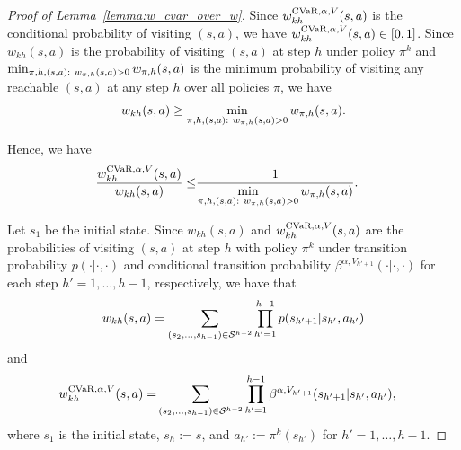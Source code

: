 \begin{proof}[Proof of Lemma~\ref{lemma:w_cvar_over_w}]
	Since $w^{\textup{CVaR},\alpha,V}_{kh}(s,a)$ is the conditional probability of visiting $(s,a)$, we have 
	$w^{\textup{CVaR},\alpha,V}_{kh}(s,a) \in [0,1]$.
	Since $w_{kh}(s,a)$ is the probability of visiting $(s,a)$ at step $h$ under policy $\pi^k$ and $\min_{\begin{subarray}{c}\pi,h,(s,a):\  w_{\pi,h}(s,a)>0\end{subarray}} w_{\pi,h}(s,a)$ is the minimum probability of visiting any reachable $(s,a)$ at any step $h$ over all policies $\pi$, we have
	\begin{align*}
		w_{kh}(s,a) \geq \min \limits_{\begin{subarray}{c}\pi,h,(s,a):\  w_{\pi,h}(s,a)>0\end{subarray}} w_{\pi,h}(s,a) . 
	\end{align*} 
	
	Hence, we have
	\begin{align}
		\frac{w^{\textup{CVaR},\alpha,V}_{kh}(s,a)}{w_{kh}(s,a)} \leq & \frac{1}{\min \limits_{\begin{subarray}{c}\pi,h,(s,a):\  w_{\pi,h}(s,a)>0\end{subarray}} w_{\pi,h}(s,a)} . \label{eq:1_over_w_min}
	\end{align}
	
	Let $s_1$ be the initial state. Since $w_{kh}(s,a)$ and $w^{\textup{CVaR},\alpha,V}_{kh}(s,a)$ are the probabilities of visiting $(s,a)$ at step $h$ with policy $\pi^k$ under transition probability $p(\cdot|\cdot,\cdot)$ and conditional transition probability $\beta^{\alpha,V_{h'+1}}(\cdot|\cdot,\cdot)$ for each step $h'=1,\dots,h-1$, respectively, we have that
	\begin{align*}
		w_{kh}(s,a) = \sum_{(s_2,\dots,s_{h-1}) \in \mathcal{S}^{h-2}} \prod_{h'=1}^{h-1} p(s_{h'+1}|s_{h'},a_{h'}) 
	\end{align*}
	and
	\begin{align*}
		w^{\textup{CVaR},\alpha,V}_{kh}(s,a) = & \sum_{(s_2,\dots,s_{h-1}) \in \mathcal{S}^{h-2}} \prod_{h'=1}^{h-1} \beta^{\alpha,V_{h'+1}}(s_{h'+1}|s_{h'},a_{h'}) ,
	\end{align*}
	where $s_1$ is the initial state, $s_h:=s$, and $a_{h'}:=\pi^k(s_{h'})$ for $h'=1,\dots,h-1$. 
	

\end{proof}

